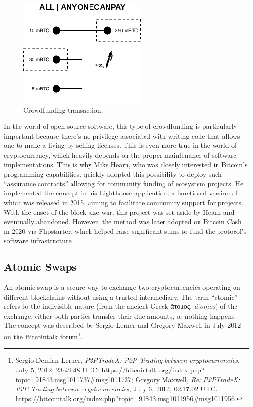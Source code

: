 \documentclass[
  a5paper,
  smalldemyvopaper,10pt,twoside,onecolumn,openright,extrafontsizes,hidelinks]{memoir}
\begin{document}
\begin{figure}

{\centering \includegraphics{chapters/img/sighash-anyonecanpay.png}

}

\caption{Crowdfunding transaction.}

\end{figure}%

In the world of open-source software, this type of crowdfunding is
particularly important because there's no privilege associated with
writing code that allows one to make a living by selling licenses. This
is even more true in the world of cryptocurrency, which heavily depends
on the proper maintenance of software implementations. This is why Mike
Hearn, who was closely interested in Bitcoin's programming capabilities,
quickly adopted this possibility to deploy such ``assurance contracts''
allowing for community funding of ecosystem projects. He implemented the
concept in his Lighthouse application, a functional version of which was
released in 2015, aiming to facilitate community support for projects.
With the onset of the block size war, this project was set aside by
Hearn and eventually abandoned. However, the method was later adopted on
Bitcoin Cash in 2020 via Flipstarter, which helped raise significant
sums to fund the protocol's software infrastructure.

\subsection{Atomic Swaps}\label{atomic-swaps}

An atomic swap is a secure way to exchange two cryptocurrencies
operating on different blockchains without using a trusted intermediary.
The term ``atomic'' refers to the indivisible nature (from the ancient
Greek \foreignlanguage{greek}{ἄτομος}, \emph{átomos}) of the exchange:
either both parties transfer their due amounts, or nothing happens. The
concept was described by Sergio Lerner and Gregory Maxwell in July 2012
on the Bitcointalk forum\footnote{Sergio Demian Lerner, \emph{P2PTradeX:
  P2P Trading between cryptocurrencies}, July 5, 2012, 23:49:48 UTC:
  \url{https://bitcointalk.org/index.php?topic=91843.msg1011737\#msg1011737};
  Gregory Maxwell, \emph{Re: P2PTradeX: P2P Trading between
  cryptocurrencies}, July 6, 2012, 02:17:02 UTC:
  \url{https://bitcointalk.org/index.php?topic=91843.msg1011956\#msg1011956}.}.
\end{document}
